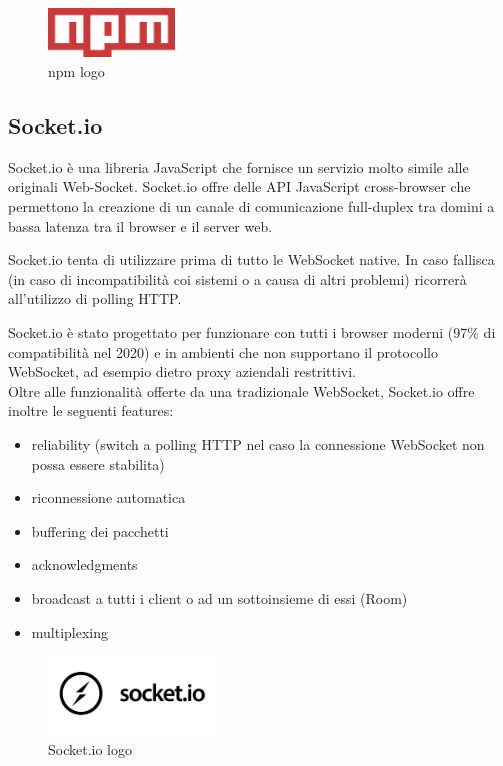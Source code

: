 \begin{figure}[H]
\centering
\includegraphics[width=0.3\textwidth]{img/logos/npm_logo.png}
\caption{npm logo}
\label{fig:npm}
\end{figure}

\subsection{Socket.io}
Socket.io è una libreria JavaScript che fornisce un servizio molto simile alle originali Web-Socket. Socket.io offre delle API JavaScript cross-browser che permettono la creazione di un canale di comunicazione full-duplex tra domini a bassa latenza tra il browser e il server web.

Socket.io tenta di utilizzare prima di tutto le WebSocket native. In caso fallisca (in caso di incompatibilità coi sistemi o a causa di altri problemi)
ricorrerà all'utilizzo di polling HTTP.

Socket.io è stato progettato per funzionare con tutti i browser moderni (97\% di compatibilità nel 2020) e in ambienti che non
supportano il protocollo WebSocket, ad esempio dietro proxy aziendali restrittivi.\\

Oltre alle funzionalità offerte da una tradizionale WebSocket, Socket.io offre inoltre le seguenti features:
\begin{itemize}
    \item reliability (switch a polling HTTP nel caso la connessione WebSocket non possa essere stabilita)
    \item riconnessione automatica
    \item buffering dei pacchetti
    \item acknowledgments
    \item broadcast a tutti i client o ad un sottoinsieme di essi (Room)
    \item multiplexing
\end{itemize}

\begin{figure}[H]
\centering
\includegraphics[width=0.4\textwidth]{img/logos/socketIO_logo.jpg}
\caption{Socket.io logo}
\label{fig:socketio}
\end{figure}

